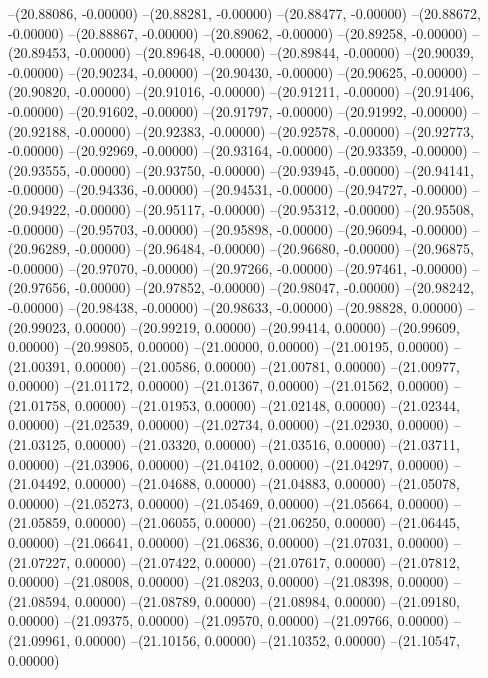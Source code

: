 --(20.88086, -0.00000)
--(20.88281, -0.00000)
--(20.88477, -0.00000)
--(20.88672, -0.00000)
--(20.88867, -0.00000)
--(20.89062, -0.00000)
--(20.89258, -0.00000)
--(20.89453, -0.00000)
--(20.89648, -0.00000)
--(20.89844, -0.00000)
--(20.90039, -0.00000)
--(20.90234, -0.00000)
--(20.90430, -0.00000)
--(20.90625, -0.00000)
--(20.90820, -0.00000)
--(20.91016, -0.00000)
--(20.91211, -0.00000)
--(20.91406, -0.00000)
--(20.91602, -0.00000)
--(20.91797, -0.00000)
--(20.91992, -0.00000)
--(20.92188, -0.00000)
--(20.92383, -0.00000)
--(20.92578, -0.00000)
--(20.92773, -0.00000)
--(20.92969, -0.00000)
--(20.93164, -0.00000)
--(20.93359, -0.00000)
--(20.93555, -0.00000)
--(20.93750, -0.00000)
--(20.93945, -0.00000)
--(20.94141, -0.00000)
--(20.94336, -0.00000)
--(20.94531, -0.00000)
--(20.94727, -0.00000)
--(20.94922, -0.00000)
--(20.95117, -0.00000)
--(20.95312, -0.00000)
--(20.95508, -0.00000)
--(20.95703, -0.00000)
--(20.95898, -0.00000)
--(20.96094, -0.00000)
--(20.96289, -0.00000)
--(20.96484, -0.00000)
--(20.96680, -0.00000)
--(20.96875, -0.00000)
--(20.97070, -0.00000)
--(20.97266, -0.00000)
--(20.97461, -0.00000)
--(20.97656, -0.00000)
--(20.97852, -0.00000)
--(20.98047, -0.00000)
--(20.98242, -0.00000)
--(20.98438, -0.00000)
--(20.98633, -0.00000)
--(20.98828, 0.00000)
--(20.99023, 0.00000)
--(20.99219, 0.00000)
--(20.99414, 0.00000)
--(20.99609, 0.00000)
--(20.99805, 0.00000)
--(21.00000, 0.00000)
--(21.00195, 0.00000)
--(21.00391, 0.00000)
--(21.00586, 0.00000)
--(21.00781, 0.00000)
--(21.00977, 0.00000)
--(21.01172, 0.00000)
--(21.01367, 0.00000)
--(21.01562, 0.00000)
--(21.01758, 0.00000)
--(21.01953, 0.00000)
--(21.02148, 0.00000)
--(21.02344, 0.00000)
--(21.02539, 0.00000)
--(21.02734, 0.00000)
--(21.02930, 0.00000)
--(21.03125, 0.00000)
--(21.03320, 0.00000)
--(21.03516, 0.00000)
--(21.03711, 0.00000)
--(21.03906, 0.00000)
--(21.04102, 0.00000)
--(21.04297, 0.00000)
--(21.04492, 0.00000)
--(21.04688, 0.00000)
--(21.04883, 0.00000)
--(21.05078, 0.00000)
--(21.05273, 0.00000)
--(21.05469, 0.00000)
--(21.05664, 0.00000)
--(21.05859, 0.00000)
--(21.06055, 0.00000)
--(21.06250, 0.00000)
--(21.06445, 0.00000)
--(21.06641, 0.00000)
--(21.06836, 0.00000)
--(21.07031, 0.00000)
--(21.07227, 0.00000)
--(21.07422, 0.00000)
--(21.07617, 0.00000)
--(21.07812, 0.00000)
--(21.08008, 0.00000)
--(21.08203, 0.00000)
--(21.08398, 0.00000)
--(21.08594, 0.00000)
--(21.08789, 0.00000)
--(21.08984, 0.00000)
--(21.09180, 0.00000)
--(21.09375, 0.00000)
--(21.09570, 0.00000)
--(21.09766, 0.00000)
--(21.09961, 0.00000)
--(21.10156, 0.00000)
--(21.10352, 0.00000)
--(21.10547, 0.00000)
